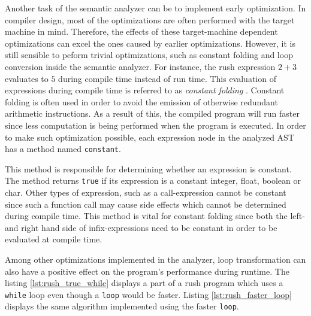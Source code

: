 Another task of the semantic analyzer can be to implement early optimization.
In compiler design, most of the optimizations are often performed with the target machine in mind.
Therefore, the effects of these target-machine dependent optimizations can excel the ones caused by earlier optimizations.
However, it is still sensible to peform trivial optimizations, such as constant folding and loop conversion inside the semantic analyzer.
For instance, the rush expression $2 + 3$ evaluates to $5$ during compile time instead of run time.
This evaluation of expressions during compile time is referred to as \emph{constant folding} \cite[p.~54]{wirth_compiler_construction_2005}.
Constant folding is often used in order to avoid the emission of otherwise redundant arithmetic instructions.
As a result of this, the compiled program will run faster since less computation is being performed when the program is executed.
In order to make such optimization possible, each expression node in the analyzed AST has a method named \texttt{constant}.


This method is responsible for determining whether an expression is constant.
The method returns \texttt{true} if its expression is a constant integer, float, boolean or char.
Other types of expression, such as a call-expression cannot be constant since such a function call may cause side effects which cannot be determined during compile time.
This method is vital for constant folding since both the left- and right hand side of infix-expressions need to be constant in order to be evaluated at compile time.

Among other optimizations implemented in the analyzer, loop transformation can also have a positive effect on the program's performance during runtime.
The listing \ref{lst:rush_true_while} displays a part of a rush program which uses a \texttt{while} loop even though a \texttt{loop} would be faster.
Listing \ref{lst:rush_faster_loop} displays the same algorithm implemented using the faster \texttt{loop}.


